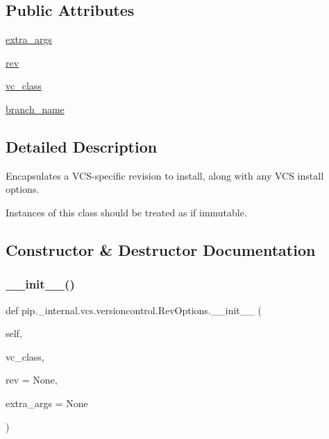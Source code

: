 \subsection*{Public Attributes}
\begin{DoxyCompactItemize}
\item 
\hyperlink{classpip_1_1__internal_1_1vcs_1_1versioncontrol_1_1RevOptions_a4391d5121e611505a052e4025d264a36}{extra\+\_\+args}
\item 
\hyperlink{classpip_1_1__internal_1_1vcs_1_1versioncontrol_1_1RevOptions_ab8e46bf2192c9cdb1fe57830b55d7fb8}{rev}
\item 
\hyperlink{classpip_1_1__internal_1_1vcs_1_1versioncontrol_1_1RevOptions_a770a27278283203ab75993df2c00cf5e}{vc\+\_\+class}
\item 
\hyperlink{classpip_1_1__internal_1_1vcs_1_1versioncontrol_1_1RevOptions_a3a8214dbb6f8ed974fab82343c1d3ae9}{branch\+\_\+name}
\end{DoxyCompactItemize}


\subsection{Detailed Description}
\begin{DoxyVerb}Encapsulates a VCS-specific revision to install, along with any VCS
install options.

Instances of this class should be treated as if immutable.
\end{DoxyVerb}
 

\subsection{Constructor \& Destructor Documentation}
\mbox{\label{classpip_1_1__internal_1_1vcs_1_1versioncontrol_1_1RevOptions_aae223b94ed048272015bd2434e3bf142}} 
\subsubsection{\texorpdfstring{\+\_\+\+\_\+init\+\_\+\+\_\+()}{\_\_init\_\_()}}
{\footnotesize\ttfamily def pip.\+\_\+internal.\+vcs.\+versioncontrol.\+Rev\+Options.\+\_\+\+\_\+init\+\_\+\+\_\+ (\begin{DoxyParamCaption}\item[{}]{self,  }\item[{}]{vc\+\_\+class,  }\item[{}]{rev = {\ttfamily None},  }\item[{}]{extra\+\_\+args = {\ttfamily None} }\end{DoxyParamCaption})}

